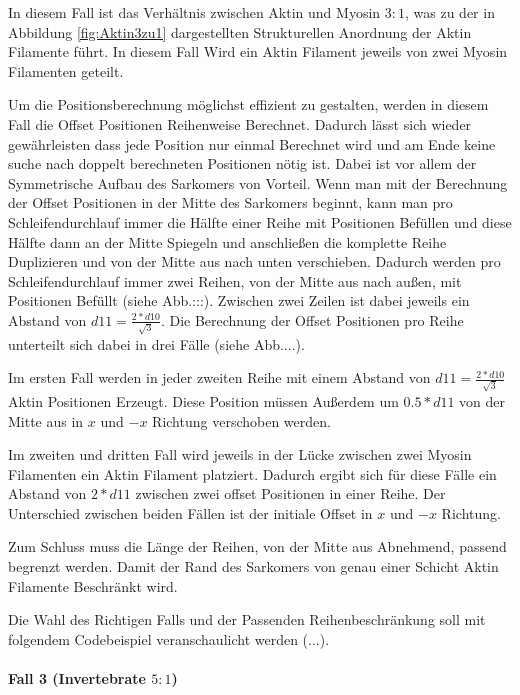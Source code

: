\documentclass[a4paper,m]{cgBA}
\begin{document}
In diesem Fall ist das Verhältnis zwischen Aktin und Myosin \(3:1\), was zu der in Abbildung \ref{fig:Aktin3zu1} dargestellten Strukturellen Anordnung der Aktin Filamente führt. In diesem Fall Wird ein Aktin Filament jeweils von zwei Myosin Filamenten geteilt.

Um die Positionsberechnung möglichst effizient zu gestalten, werden in diesem Fall die Offset Positionen Reihenweise Berechnet. 
Dadurch lässt sich wieder gewährleisten dass jede Position nur einmal Berechnet wird und am Ende keine suche nach doppelt berechneten Positionen nötig ist. Dabei ist vor allem der Symmetrische Aufbau des Sarkomers von Vorteil. Wenn man mit der Berechnung der Offset Positionen in der Mitte des Sarkomers beginnt, kann man pro Schleifendurchlauf immer die Hälfte einer Reihe mit Positionen Befüllen und diese Hälfte dann an der Mitte Spiegeln und anschließen die komplette Reihe Duplizieren und von der Mitte aus nach unten verschieben. Dadurch werden pro Schleifendurchlauf immer zwei Reihen, von der Mitte aus nach außen, mit Positionen Befüllt (siehe Abb.:::). Zwischen zwei Zeilen ist dabei jeweils ein Abstand von \(d11 = \frac{2 * d10}{\sqrt{3}}\). 
Die Berechnung der Offset Positionen pro Reihe unterteilt sich dabei in drei Fälle (siehe Abb....). 

Im ersten Fall werden in jeder zweiten Reihe mit einem Abstand von \(d11 = \frac{2 * d10}{\sqrt{3}}\) Aktin Positionen Erzeugt. Diese Position müssen Außerdem um \(0.5 * d11\) von der Mitte aus in \(x\) und \(-x\) Richtung verschoben werden.

Im zweiten und dritten Fall wird jeweils in der Lücke zwischen zwei Myosin Filamenten ein Aktin Filament platziert. Dadurch ergibt sich für diese Fälle ein Abstand von \(2 * d11\) zwischen zwei offset Positionen in einer Reihe. Der Unterschied zwischen beiden Fällen ist der initiale Offset in \(x\) und \(-x\) Richtung. 

Zum Schluss muss die Länge der Reihen, von der Mitte aus Abnehmend, passend begrenzt werden. Damit der Rand des Sarkomers von genau einer Schicht Aktin Filamente Beschränkt wird. 

Die Wahl des Richtigen Falls und der Passenden Reihenbeschränkung soll mit folgendem Codebeispiel veranschaulicht werden (...).

\paragraph{Fall 3 (Invertebrate \(5:1\))}
\end{document}

